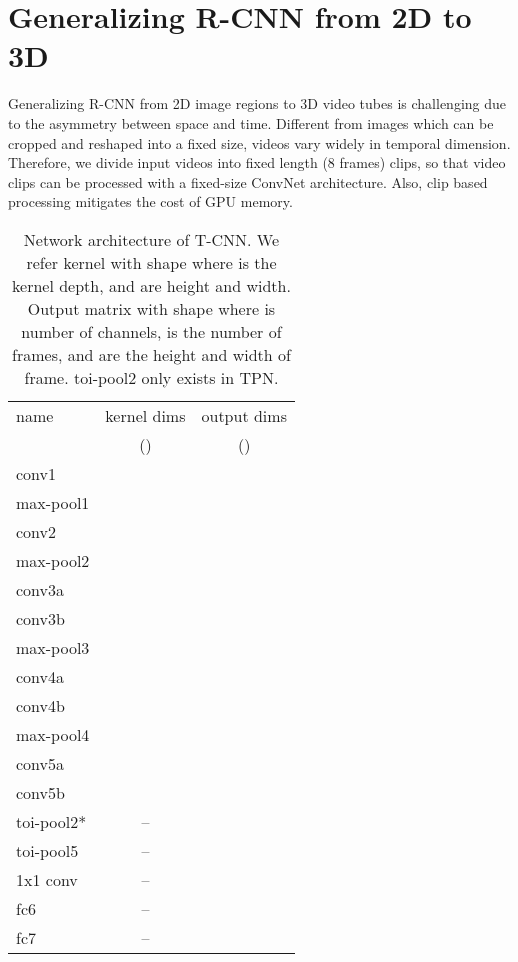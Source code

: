 \documentclass[10pt,twocolumn,letterpaper]{article}
\begin{document}
\section{Generalizing R-CNN from 2D to 3D}
\label{sec:difference}
Generalizing R-CNN from 2D image regions to 3D video tubes is challenging due to the asymmetry between space and time.
Different from images which can be cropped and reshaped into a fixed size, videos vary widely in temporal dimension. Therefore, we divide input videos into fixed length (8 frames) clips, so that video clips  can be processed with a fixed-size ConvNet architecture. Also, clip based processing mitigates the cost of GPU memory.

\begin{table}
\begin{center}
\small
\begin{tabular}{lcc}
\hline
name            & kernel dims        & output dims \\
 &  () & () \\
\hline
conv1           &  &  \\
max-pool1       &  &  \\
conv2           &  &  \\
max-pool2       &  &  \\
conv3a          &  &  \\
conv3b          &  &  \\
max-pool3       &  &  \\
conv4a          &  &  \\
conv4b          &  &  \\
max-pool4       &  &  \\
conv5a          &  &  \\
conv5b          &  &  \\
\hline
toi-pool2*      & --                &  \\
toi-pool5       & --                &  \\
1x1 conv        & --                &  \\
\hline
fc6             & --                &  \\
fc7             & --                &  \\
\hline
\end{tabular}
\caption{Network architecture of T-CNN. We refer kernel with shape  where  is the kernel depth,  and  are height and width. Output matrix with shape  where  is number of channels,  is the number of frames,  and  are the height and width of frame. toi-pool2 only exists in TPN.}
\label{tab:architecture}
\end{center}
\end{table}
\end{document}
